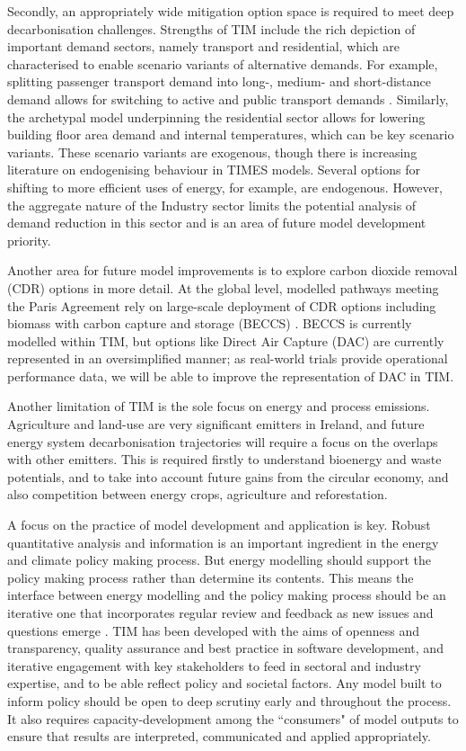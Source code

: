 \documentclass[gmd,manuscript]{copernicus}
\begin{document}
Secondly, an appropriately wide mitigation option space is required to meet deep decarbonisation challenges. Strengths of TIM include the rich depiction of important demand sectors, namely transport and residential, which are characterised to enable scenario variants of alternative demands. For example, splitting passenger transport demand into long-, medium- and short-distance demand allows for switching to active and public transport demands . Similarly, the archetypal model underpinning the residential sector allows for lowering building floor area demand and internal temperatures, which can be key scenario variants. These scenario variants are exogenous, though there is increasing literature on endogenising behaviour in TIMES models. Several options for shifting to more efficient uses of energy, for example, are endogenous. However, the aggregate nature of the Industry sector limits the potential analysis of demand reduction in this sector and is an area of future model development priority.

Another area for future model improvements is to explore carbon dioxide removal (CDR) options in more detail. At the global level, modelled pathways meeting the Paris Agreement rely on large-scale deployment of CDR options including biomass with carbon capture and storage (BECCS) \citep{IPCC2018}. BECCS is currently modelled within TIM, but options like Direct Air Capture (DAC) \citep{Realmonte2019} are currently represented in an oversimplified manner; as real-world trials provide operational performance data, we will be able to improve the representation of DAC in TIM.

Another limitation of TIM is the sole focus on energy and process emissions. Agriculture and land-use are very significant emitters in Ireland, and future energy system decarbonisation trajectories will require a focus on the overlaps with other emitters. This is required firstly to understand bioenergy and waste potentials, and to take into account future gains from the circular economy, and also competition between energy crops, agriculture and reforestation.

A focus on the practice of model development and application is key. Robust quantitative analysis and information is an important ingredient in the energy and climate policy making process. But energy modelling should support the policy making process rather than determine its contents. This means the interface between energy modelling and the policy making process should be an iterative one that incorporates regular review and feedback as new issues and questions emerge \citep{Strachan2016}. TIM has been developed with the aims of openness and transparency, quality assurance and best practice in software development, and iterative engagement with key stakeholders to feed in sectoral and industry expertise, and to be able reflect policy and societal factors. Any model built to inform policy should be open to deep scrutiny early and throughout the process. It also requires capacity-development among the ``consumers" of model outputs to ensure that results are interpreted, communicated and applied appropriately.
\end{document}
